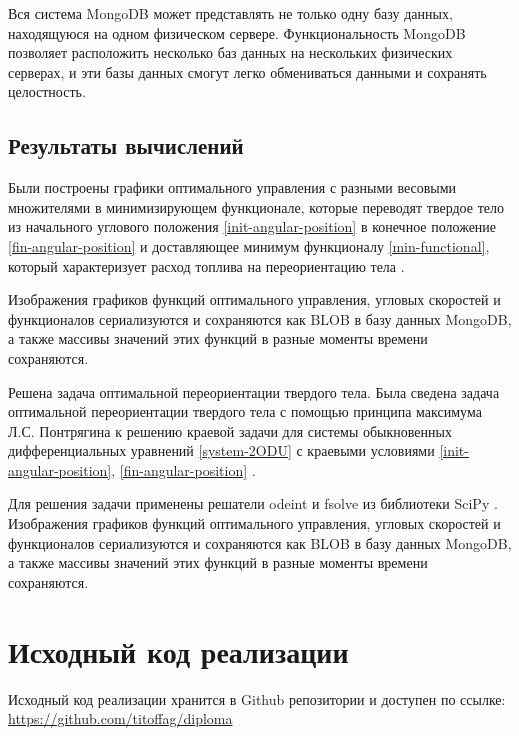 \documentclass[14pt]{extreport}
\begin{document}
Вся система MongoDB может представлять не только одну базу данных, находящуюся на одном физическом сервере. Функциональность MongoDB позволяет расположить несколько баз данных на нескольких физических серверах, и эти базы данных смогут легко обмениваться данными и сохранять целостность.

\section{Результаты вычислений}
Были построены графики оптимального управления с разными весовыми множителями в минимизирующем функционале, которые переводят твердое тело из начального углового положения \eqref{init-angular-position} в конечное положение \eqref{fin-angular-position} и доставляющее минимум функционалу \eqref{min-functional}, который характеризует расход топлива на переориентацию тела \cite{samarskii}.

Изображения графиков функций оптимального управления, угловых скоростей и функционалов сериализуются и сохраняются как BLOB в базу данных MongoDB, а также массивы значений этих функций в разные моменты времени сохраняются.

\conclusions

Решена задача оптимальной переориентации твердого тела. Была сведена задача оптимальной переориентации твердого тела с помощью принципа максимума Л.С. Понтрягина к решению краевой задачи для системы обыкновенных дифференциальных уравнений \eqref{system-2ODU} с краевыми условиями \eqref{init-angular-position}, \eqref{fin-angular-position} \cite{vasileva}.
 
Для решения задачи применены решатели odeint и fsolve из библиотеки SciPy \cite{lutz}. Изображения графиков функций оптимального управления, угловых скоростей и функционалов сериализуются и сохраняются как BLOB в базу данных MongoDB, а также массивы значений этих функций в разные моменты времени сохраняются.


\nocite{*}


\Appendix

\chapter{Исходный код реализации}
Исходный код реализации хранится в Github репозитории и доступен по ссылке: \href{https://github.com/titoffag/diploma}{https://github.com/titoffag/diploma}
\end{document}
